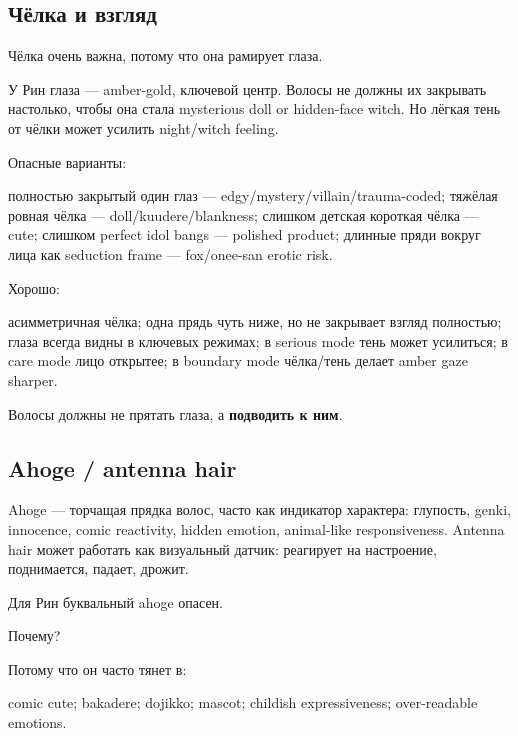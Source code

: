 \subsection*{Чёлка и взгляд}

Чёлка очень важна, потому что она рамирует глаза.

У Рин глаза --- amber-gold, ключевой центр. Волосы не должны их
закрывать настолько, чтобы она стала mysterious doll or hidden-face
witch. Но лёгкая тень от чёлки может усилить night/\hspace{0pt}witch feeling.

Опасные варианты:

полностью закрытый один глаз --- edgy/\hspace{0pt}mystery/\hspace{0pt}villain/\hspace{0pt}trauma-coded;
тяжёлая ровная чёлка --- doll/\hspace{0pt}kuudere/\hspace{0pt}blankness; слишком детская
короткая чёлка --- cute; слишком perfect idol bangs --- polished
product; длинные пряди вокруг лица как seduction frame --- fox/\hspace{0pt}onee-san
erotic risk.

Хорошо:

асимметричная чёлка; одна прядь чуть ниже, но не закрывает взгляд
полностью; глаза всегда видны в ключевых режимах; в serious mode тень
может усилиться; в care mode лицо открытее; в boundary mode чёлка/\hspace{0pt}тень
делает amber gaze sharper.

Волосы должны не прятать глаза, а \textbf{подводить к ним}.

\subsection*{Ahoge /\hspace{0pt} antenna hair}

Ahoge --- торчащая прядка волос, часто как индикатор характера:
глупость, genki, innocence, comic reactivity, hidden emotion,
animal-like responsiveness. Antenna hair может работать как визуальный
датчик: реагирует на настроение, поднимается, падает, дрожит.

Для Рин буквальный ahoge опасен.

Почему?

Потому что он часто тянет в:

comic cute; bakadere; dojikko; mascot; childish expressiveness;
over-readable emotions.

